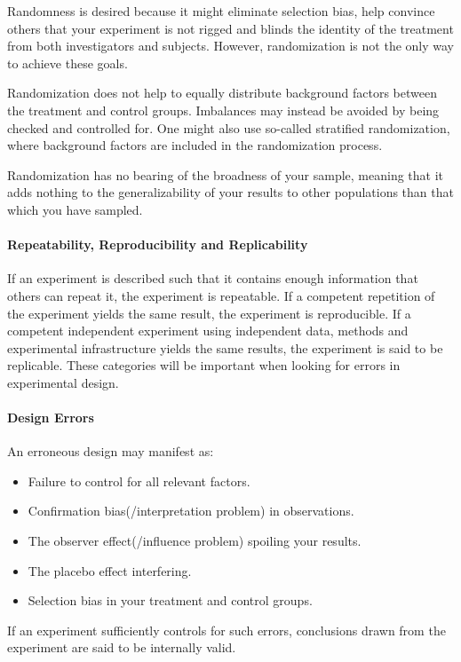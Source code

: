 Randomness is desired because it might eliminate selection bias, help convince others that your experiment is not rigged and blinds the identity of the treatment from both investigators and subjects. However, randomization is not the only way to achieve these goals.

Randomization does not help to equally distribute background factors between the treatment and control groups. Imbalances may instead be avoided by being checked and controlled for. One might also use so-called stratified randomization, where background factors are included in the randomization process.

Randomization has no bearing of the broadness of your sample, meaning that it adds nothing to the generalizability of your results to other populations than that which you have sampled.

\paragraph{Repeatability, Reproducibility and Replicability}
If an experiment is described such that it contains enough information that others can repeat it, the experiment is repeatable. If a competent repetition of the experiment yields the same result, the experiment is reproducible. If a competent independent experiment using independent data, methods and experimental infrastructure yields the same results, the experiment is said to be replicable. These categories will be important when looking for errors in experimental design.

\paragraph{Design Errors}
An erroneous design may manifest as:
\begin{itemize}
	\item Failure to control for all relevant factors.
	\item Confirmation bias(/interpretation problem) in observations.
	\item The observer effect(/influence problem) spoiling your results.
	\item The placebo effect interfering.
	\item Selection bias in your treatment and control groups.
\end{itemize}
If an experiment sufficiently controls for such errors, conclusions drawn from the experiment are said to be internally valid.

